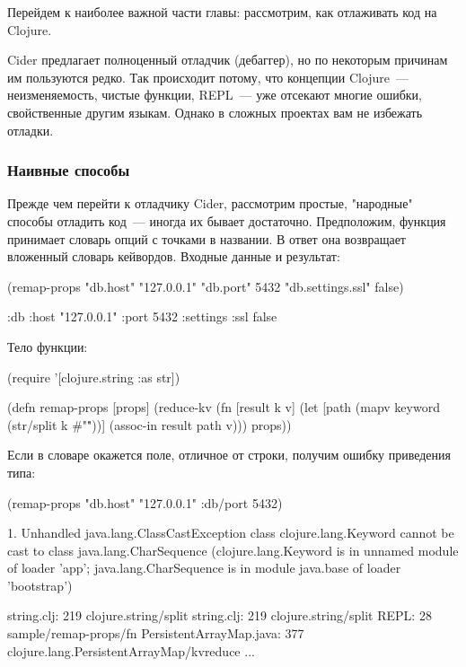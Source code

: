 Перейдем к наиболее важной части главы: рассмотрим, как отлаживать код на Clojure.

Cider предлагает полноценный отладчик (дебаггер), но по некоторым причинам им пользуются редко. Так происходит потому, что концепции Clojure~--- неизменяемость, чистые функции, REPL~--- уже отсекают многие ошибки, свойственные другим языкам. Однако в сложных проектах вам не избежать отладки.

\subsubsection{Наивные способы}

Прежде чем перейти к отладчику Cider, рассмотрим простые, "народные" способы отладить код~--- иногда их бывает достаточно. Предположим, функция принимает словарь опций с точками в названии. В ответ она возвращает вложенный словарь кейвордов. Входные данные и результат:

\begin{english}
  \begin{clojure}
(remap-props {"db.host" "127.0.0.1"
              "db.port" 5432
              "db.settings.ssl" false})

{:db
 {:host "127.0.0.1"
  :port 5432
  :settings {:ssl false}}}
  \end{clojure}
\end{english}

Тело функции:

\begin{english}
  \begin{clojure}
(require '[clojure.string :as str])

(defn remap-props [props]
  (reduce-kv
   (fn [result k v]
     (let [path
           (mapv keyword (str/split k #"\."))]
       (assoc-in result path v)))
   {}
   props))
  \end{clojure}
\end{english}

Если в словаре окажется поле, отличное от строки, получим ошибку приведения типа:

\begin{english}
  \begin{text}
(remap-props {"db.host" "127.0.0.1" :db/port 5432})

1. Unhandled java.lang.ClassCastException
   class clojure.lang.Keyword cannot be cast to class java.lang.CharSequence
   (clojure.lang.Keyword is in unnamed module of loader 'app';
   java.lang.CharSequence is in module java.base of loader 'bootstrap')

                string.clj:  219  clojure.string/split
                string.clj:  219  clojure.string/split
                      REPL:   28  sample/remap-props/fn
   PersistentArrayMap.java:  377  clojure.lang.PersistentArrayMap/kvreduce
   ...
  \end{text}
\end{english}

